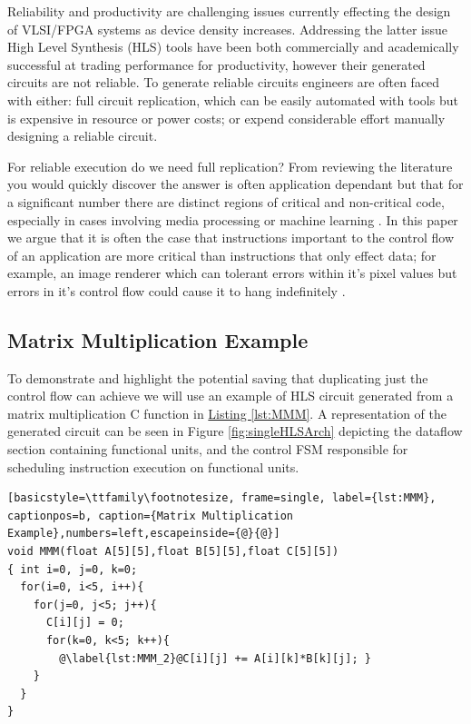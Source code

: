 \providecommand*{\lstnumberautorefname}{line}

Reliability and productivity are challenging issues
currently effecting the design of VLSI/FPGA systems as
device density increases.
Addressing the latter issue High Level Synthesis (HLS) tools \cite{canis2011legup} have
been both commercially and academically successful at trading
performance for productivity, however their generated circuits are not reliable.
To generate reliable circuits engineers are often faced with either:
full circuit replication, which can be easily automated with tools but
is expensive in resource or power costs; or expend considerable
effort manually designing a reliable circuit.

For reliable execution do we need full replication?
From reviewing the literature you would quickly discover the answer
is often application dependant but that for a significant number
there are distinct regions of critical and non-critical code,
especially in cases involving media processing or machine
learning\cite{wong2006soft} \cite{liu2012flikker}.
In this paper we argue that it is often the case that instructions important to the control flow of an application are more critical
than instructions that only effect data; for example, an image renderer which can tolerant errors within
it's pixel values but errors in it's control flow could cause it to hang indefinitely \cite{sampson2011enerj}.

\subsection{Matrix Multiplication Example}
To demonstrate and highlight the potential saving that duplicating just
the control flow can achieve we will use an example of HLS circuit generated from a
matrix multiplication C function in \hyperref[lst:MMM]{Listing \ref{lst:MMM}}.
A representation of the generated circuit can be seen in Figure \ref{fig:singleHLSArch}
depicting the dataflow section containing functional units, and the
control FSM responsible for scheduling instruction execution on functional units.

\lstset{language=C}
\begin{lstlisting}[basicstyle=\ttfamily\footnotesize, frame=single, label={lst:MMM}, captionpos=b, caption={Matrix Multiplication Example},numbers=left,escapeinside={@}{@}]
void MMM(float A[5][5],float B[5][5],float C[5][5])
{ int i=0, j=0, k=0;
  for(i=0, i<5, i++){
    for(j=0, j<5; j++){
      C[i][j] = 0;
      for(k=0, k<5; k++){
        @\label{lst:MMM_2}@C[i][j] += A[i][k]*B[k][j]; }
    }
  }
}
\end{lstlisting}

